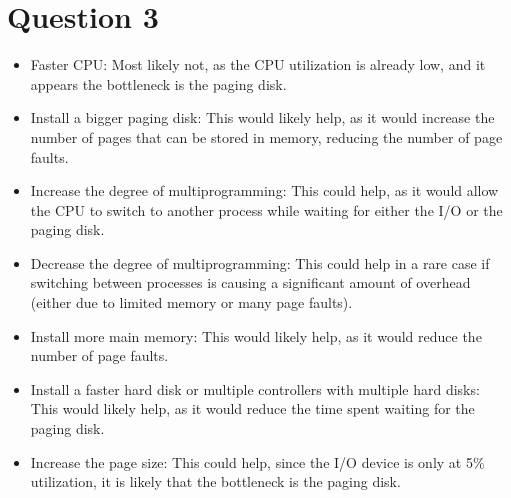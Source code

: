 \documentclass{article}
\begin{document}
\section*{Question 3}
\begin{itemize}
    \item Faster CPU: Most likely not, as the CPU utilization is already low, and it appears the bottleneck is the paging disk.
    \item Install a bigger paging disk: This would likely help, as it would
          increase the number of pages that can be stored in memory, reducing the
          number of page faults.
    \item Increase the degree of multiprogramming: This could help, as it would
          allow the CPU to switch to another process while waiting for either the I/O
          or the paging disk.
    \item Decrease the degree of multiprogramming: This could help in a rare
          case if switching between processes is causing a significant amount of
          overhead (either due to limited memory or many page faults).
    \item Install more main memory: This would likely help, as it would reduce the
          number of page faults.
    \item Install a faster hard disk or multiple controllers with multiple hard disks: This would likely help, as it would reduce the time spent waiting for the paging disk.
    \item Increase the page size: This could help, since the I/O device is only at 5\% utilization, it is likely that the bottleneck is the paging disk.
\end{itemize}
\end{document}
